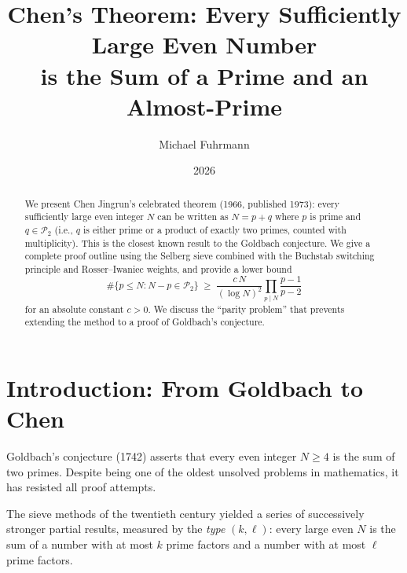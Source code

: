 \documentclass[12pt,a4paper]{amsart}
\theoremstyle{definition}
\newcommand{\Ptwo}{\mathcal{P}_2}
\begin{document}

\title{Chen's Theorem: Every Sufficiently Large Even Number\\
       is the Sum of a Prime and an Almost-Prime}

\author{Michael Fuhrmann}
\address{Specialist Mathematics Project, Build 56}
\date{2026}

\begin{abstract}
We present Chen Jingrun's celebrated theorem (1966, published 1973): every
sufficiently large even integer $N$ can be written as
$N = p + q$
where $p$ is prime and $q \in \Ptwo$ (i.e., $q$ is either prime or a product
of exactly two primes, counted with multiplicity).  This is the closest known
result to the Goldbach conjecture.  We give a complete proof outline using the
Selberg sieve combined with the Buchstab switching principle and
Rosser--Iwaniec weights, and provide a lower bound
\[
  \#\bigl\{p \leq N : N - p \in \Ptwo\bigr\}
  \;\geq\;
  \frac{c\, N}{(\log N)^2}\prod_{p \mid N}\frac{p-1}{p-2}
\]
for an absolute constant $c > 0$.  We discuss the ``parity problem'' that
prevents extending the method to a proof of Goldbach's conjecture.
\end{abstract}

\maketitle
\tableofcontents

\section{Introduction: From Goldbach to Chen}

Goldbach's conjecture (1742) asserts that every even integer $N \geq 4$
is the sum of two primes.  Despite being one of the oldest unsolved problems
in mathematics, it has resisted all proof attempts.

The sieve methods of the twentieth century yielded a series of successively
stronger partial results, measured by the \emph{type} $(k, \ell)$: every
large even $N$ is the sum of a number with at most $k$ prime factors and a
number with at most $\ell$ prime factors.
\end{document}
